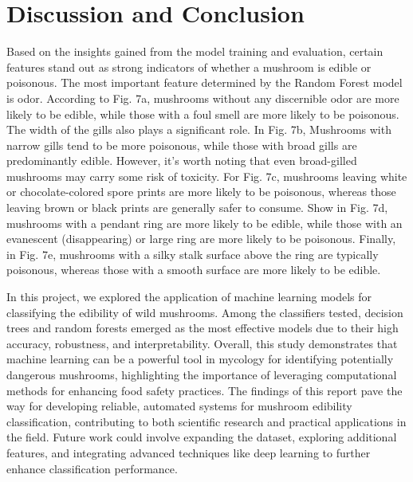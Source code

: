 \documentclass[11pt, conference]{IEEEtran}
\begin{document}
\section{Discussion and Conclusion}
    Based on the insights gained from the model training and evaluation, certain features stand out as strong indicators of whether a mushroom is edible or poisonous. The most important feature determined by the Random Forest model is odor. According to Fig. 7a, mushrooms without any discernible odor are more likely to be edible, while those with a foul smell are more likely to be poisonous. The width of the gills also plays a significant role. In Fig. 7b, Mushrooms with narrow gills tend to be more poisonous, while those with broad gills are predominantly edible. However, it's worth noting that even broad-gilled mushrooms may carry some risk of toxicity. For Fig. 7c, mushrooms leaving white or chocolate-colored spore prints are more likely to be poisonous, whereas those leaving brown or black prints are generally safer to consume. Show in Fig. 7d, mushrooms with a pendant ring are more likely to be edible, while those with an evanescent (disappearing) or large ring are more likely to be poisonous. Finally, in Fig. 7e, mushrooms with a silky stalk surface above the ring are typically poisonous, whereas those with a smooth surface are more likely to be edible.

    In this project, we explored the application of machine learning models for classifying the edibility of wild mushrooms. Among the classifiers tested, decision trees and random forests emerged as the most effective models due to their high accuracy, robustness, and interpretability. Overall, this study demonstrates that machine learning can be a powerful tool in mycology for identifying potentially dangerous mushrooms, highlighting the importance of leveraging computational methods for enhancing food safety practices. The findings of this report pave the way for developing reliable, automated systems for mushroom edibility classification, contributing to both scientific research and practical applications in the field. Future work could involve expanding the dataset, exploring additional features, and integrating advanced techniques like deep learning to further enhance classification performance.
    
\end{document}

